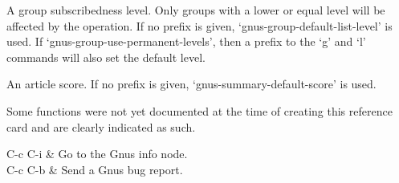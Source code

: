 \quad [level] A group subscribedness level. Only groups with a lower or
equal level will be affected by the operation. If no prefix is given,
`gnus-group-default-list-level' is used.  If
`gnus-group-use-permanent-levels', then a prefix to the `g' and `l'
commands will also set the default level.

\quad [score] An article score. If no prefix is given,
`gnus-summary-default-score' is used.

Some functions were not yet documented at the time of creating this
reference card and are clearly indicated as such.

\begin{keys}
C-c C-i & Go to the Gnus info node.\\
C-c C-b & Send a Gnus bug report.\\
\end{keys}

